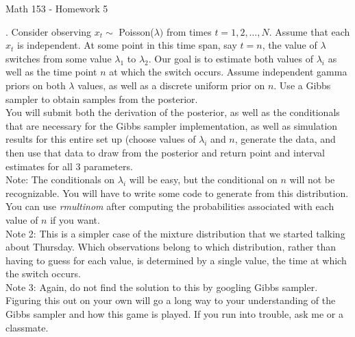 \documentclass{article}
\begin{document}
\centerline{Math 153 - Homework 5}
\vspace{.1in}
.  Consider observing $x_t \sim$ Poisson($\lambda)$ from times $t=1, 2, \dots, N$. Assume that each $x_t$ is independent.  At some point in this time span, say $t=n$, the value of $\lambda$ switches from some value $\lambda_1$ to $\lambda_2$.  Our goal is to estimate both values of $\lambda_i$ as well as the time point $n$ at which the switch occurs.  Assume independent gamma priors on both $\lambda$ values, as well as a discrete uniform prior on $n$.  Use a Gibbs sampler to obtain samples from the posterior.\\[5pt]
You will submit both the derivation of the posterior, as well as the conditionals that are necessary for the Gibbs sampler implementation, as well as simulation results for this entire set up (choose values of $\lambda_i$ and $n$, generate the data, and then use that data to draw from the posterior and return point and interval estimates for all 3 parameters.\\[5pt]
Note: The conditionals on $\lambda_i$ will be easy, but the conditional on $n$ will not be recognizable.  You will have to write some code to generate from this distribution.  You can use {\it rmultinom} after computing the probabilities associated with each value of $n$ if you want. \\[5pt]
Note 2: This is a simpler case of the mixture distribution that we started talking about Thursday.  Which observations belong to which distribution, rather than having to guess for each value, is determined by a single value, the time at which the switch occurs.\\[5pt]
Note 3: Again, do not find the solution to this by googling Gibbs sampler.  Figuring this out on your own will go a long way to your understanding of the Gibbs sampler and how this game is played.  If you run into trouble, ask me or a classmate.  
     
\end{document}
